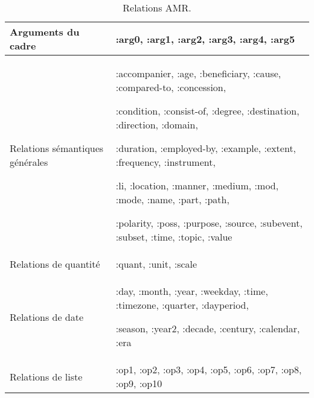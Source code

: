 \documentclass{KodeBook}
\begin{document}
\begin{table}[ht]
	\centering
	\begin{tabular}{>{\raggedright}p{}>{\raggedright\arraybackslash}p{}}
		\hline\hline
		Arguments du cadre  & 
		:arg0, :arg1, :arg2, :arg3, :arg4, :arg5 \\
		\hline
		Relations sémantiques générales &
		:accompanier, :age, :beneficiary, :cause, :compared-to, :concession, 
		
		:condition, :consist-of, :degree, :destination, :direction, :domain, 
		
		:duration, :employed-by, :example, :extent, :frequency, :instrument, 
		
		:li, :location, :manner, :medium, :mod, :mode, :name, :part, :path, 
		
		:polarity, :poss, :purpose, :source, :subevent, :subset, :time, :topic, :value \\
		\hline
		Relations de quantité &
		:quant, :unit, :scale \\
		\hline
		Relations de date &
		:day, :month,
		:year, :weekday, :time, :timezone, :quarter, :dayperiod, 
		
		:season, :year2, :decade, :century, :calendar, :era \\
		\hline
		Relations de liste & 
		:op1, :op2, :op3, :op4, :op5,
		:op6, :op7, :op8, :op9, :op10\\
		\hline\hline
	\end{tabular}
	\caption{Relations AMR.}
	\label{tab:amr-rel}
\end{table}
\end{document}
